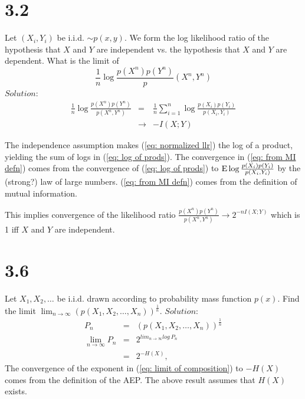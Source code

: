 \documentclass[10pt]{article}
\DeclareMathOperator*{\E}{\mbox{\text{E}}}
\newcommand{\pref}[1]{{(\ref{#1})}}
\begin{document}
\begin{tiny}
\begin{multicols}{3}
\section*{3.2}
Let $(X_i,Y_i)$ be i.i.d. $\sim p(x,y)$. We form the log likelihood ratio
of the hypothesis that $X$ and $Y$ are independent vs. the hypothesis that
$X$ and $Y$ are dependent. What is the limit of
\begin{equation}
    \frac{1}{n}\log \frac{p(X^n)p(Y^n)}p(X^n,Y^n)
    \label{eq: normalized llr}
\end{equation}
$Solution$:
\begin{eqnarray}
    \frac{1}{n}\log \frac{p(X^n)p(Y^n)}{p(X^n,Y^n)}
    &=& \frac{1}{n} \sum_{i=1}^{n} \log \frac{p(X_i)p(Y_i)}{p(X_i,Y_i)}
    \label{eq: log of prods} \\
    &\rightarrow& -I(X;Y) 
    \label{eq: from MI defn}
\end{eqnarray}

The independence assumption makes \pref{eq: normalized llr} the log of a
product, yielding the sum of logs in \pref{eq: log of prods}.
The convergence in \pref{eq: from MI defn} comes from the convergence of
\pref{eq: log of prods} to $\E \log \frac{p(X_i)p(Y_i)}{p(X_i,Y_i)}$ by
the (strong?) law of large numbers. \pref{eq: from MI defn} comes from the
definition of mutual information.

This implies convergence of the likelihood ratio
$\frac{p(X^n)p(Y^n)}{p(X^n,Y^n)} \rightarrow 2^{-nI(X;Y)}$ which is 1 iff
$X$ and $Y$ are independent.
\section*{3.6}
Let $X_1,X_2,\dots$ be i.i.d. drawn according to probability mass function
$p(x)$. Find the limit $\lim_{n \to \infty}
(p(X_1,X_2,\dots,X_n))^{\frac{1}{n}}$.
$Solution$:
\begin{eqnarray}
    P_n &=& (p(X_1,X_2,\dots,X_n))^{\frac{1}{n}}
        \label{eq: defn P_n} \\
    \lim_{n\to \infty} P_n &=& 2^{lim_{n\to\infty}log\ P_n}
        \label{eq: limit of composition} \\
    &=& 2^{-H(X)},
        \label{eq: P_n limit} 
    \end{eqnarray} 
    The convergence of the exponent in \pref{eq: limit of composition} to
    $-H(X)$ comes from the definition of the AEP.
    The above result assumes that $H(X)$ exists.

\end{multicols}
\end{tiny}
\end{document}

